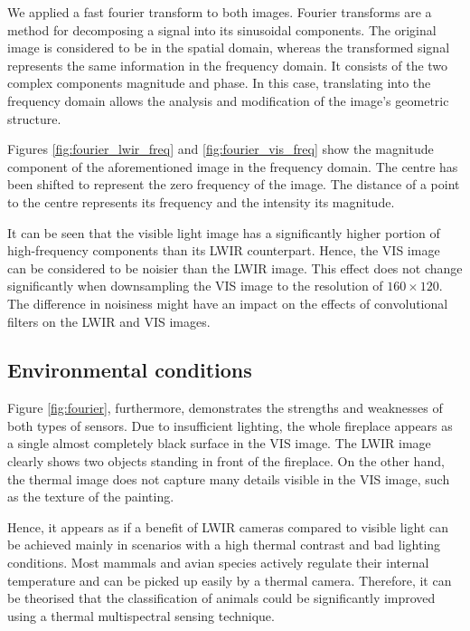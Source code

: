 \documentclass{l4proj}
\begin{document}
We applied a fast fourier transform \citep{cooley_fast_1969} to both images. Fourier transforms are a method for decomposing a signal into its sinusoidal components. The original image is considered to be in the spatial domain, whereas the transformed signal represents the same information in the frequency domain. It consists of the two complex components magnitude and phase. In this case, translating into the frequency domain allows the analysis and modification of the image's geometric structure. 

Figures \ref{fig:fourier_lwir_freq} and \ref{fig:fourier_vis_freq} show the magnitude component of the aforementioned image in the frequency domain. The centre has been shifted to represent the zero frequency of the image. The distance of a point to the centre represents its frequency and the intensity its magnitude. 

It can be seen that the visible light image has a significantly higher portion of high-frequency components than its LWIR counterpart. Hence, the VIS image can be considered to be noisier than the LWIR image. This effect does not change significantly when downsampling the VIS image to the resolution of $160 \times 120$. The difference in noisiness might have an impact on the effects of convolutional filters on the LWIR and VIS images.

\subsection{Environmental conditions}

Figure \ref{fig:fourier}, furthermore, demonstrates the strengths and weaknesses of both types of sensors. Due to insufficient lighting, the whole fireplace appears as a single almost completely black surface in the VIS image. The LWIR image clearly shows two objects standing in front of the fireplace. On the other hand, the thermal image does not capture many details visible in the VIS image, such as the texture of the painting.

Hence, it appears as if a benefit of LWIR cameras compared to visible light can be achieved mainly in scenarios with a high thermal contrast and bad lighting conditions. Most mammals and avian species actively regulate their internal temperature \citep{prinzinger_body_1991} and can be picked up easily by a thermal camera. Therefore, it can be theorised that the classification of animals could be significantly improved using a thermal multispectral sensing technique.
\end{document}
